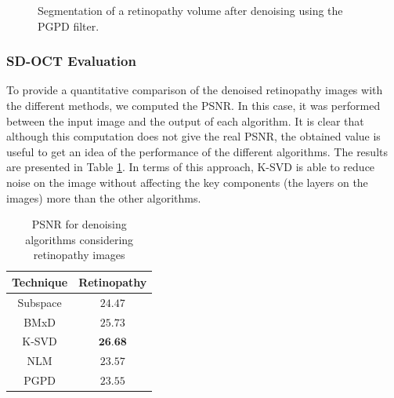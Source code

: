 \begin{figure}[H]
  \centering
  \caption{Segmentation of a retinopathy volume after denoising using the PGPD filter.} 
  \label{fig:results_rsegmentation_pgpd}
\end{figure}

\subsubsection{SD-OCT Evaluation}
To provide a quantitative comparison of the denoised retinopathy images with the different methods, we computed the PSNR. In this case, it was performed between the input image and the output of each algorithm. It is clear that although this computation does not give the real PSNR, the obtained value is useful to get an idea of the performance of the different algorithms. The results are presented in Table \ref{tab:numerical_results_retinopathy}. In terms of this approach, K-SVD is able to reduce noise on the image without affecting the key components (the layers on the images) more than the other algorithms.

\begin{table}[H]
	\centering
   	\caption{PSNR for denoising algorithms considering retinopathy images}
	\begin{tabular}{|c|c|}
	\hline
	\textbf{Technique} & \textbf{Retinopathy} \\ \hline
	Subspace & $24.47$ \\ \hline
	BMxD & $25.73$ \\ \hline
	K-SVD & $\textbf{26.68}$ \\ \hline
	NLM & $23.57$ \\ \hline
	PGPD & $23.55$ \\ \hline
	\end{tabular}
	\label{tab:numerical_results_retinopathy}
\end{table}


